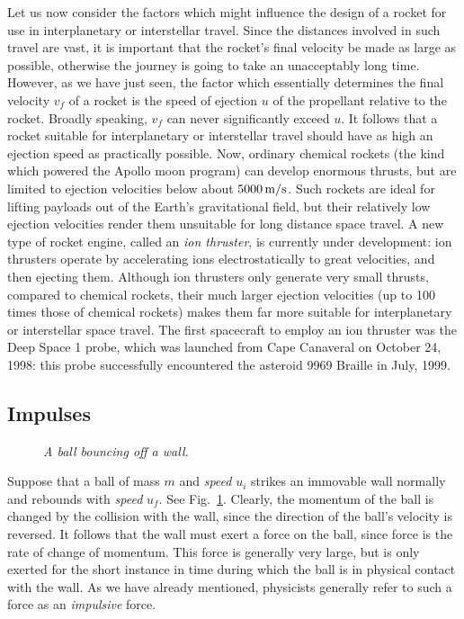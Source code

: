 Let us now consider the factors which might influence the design of a rocket for use in interplanetary or
interstellar travel. Since the distances involved in such travel are vast, it is 
important that the rocket's final velocity be made as large as possible, otherwise the journey
is going to take an unacceptably long time. However, as we have just seen, the factor which
essentially determines the final velocity $v_f$ of a rocket is the speed of ejection $u$ of
the propellant relative to the rocket. Broadly speaking, $v_f$ can never significantly
exceed $u$. It follows that a rocket suitable for interplanetary or
interstellar travel should have as high an ejection speed as practically possible.
Now, ordinary chemical rockets (the kind which powered the Apollo moon program)
can develop enormous thrusts, but are limited to ejection velocities below
about $5000\,{\rm m/s}$. Such rockets are ideal for lifting payloads out of the Earth's
gravitational field, but their relatively low ejection velocities render them unsuitable for
long distance space travel. A new type of rocket engine, called an {\em ion thruster}, is currently
under development: ion thrusters operate by accelerating ions electrostatically to great
velocities, and then ejecting them. Although ion thrusters only generate very small thrusts, compared to
chemical rockets, their much larger ejection velocities (up to 100 times those
of chemical rockets) makes them far more suitable for interplanetary or interstellar space travel.
The first spacecraft to employ an ion thruster was the
Deep Space 1 probe, which was launched from Cape Canaveral on October 24, 1998: this
probe  successfully encountered the  asteroid 9969 Braille   in July, 1999. 

\subsection{Impulses}\label{s65}
\begin{figure}
\epsfysize=2.5in
\centerline{}
\caption{\em A ball bouncing off a wall.}\label{f53}  
\end{figure}

Suppose that a ball of mass $m$ and {\em speed} $u_i$ strikes an immovable wall normally and
rebounds with {\em speed} $u_f$. See Fig.~\ref{f53}. Clearly, the momentum of the ball is changed
by the collision with the wall, since the direction of the ball's velocity is reversed.
It follows that the wall must exert a force on the ball, since force is the rate of change
of momentum. This force is generally very large, but is only exerted for the short instance in time
during which the ball is in physical contact with the wall. As we have already mentioned, physicists
generally refer to such a force as an {\em impulsive} force. 

